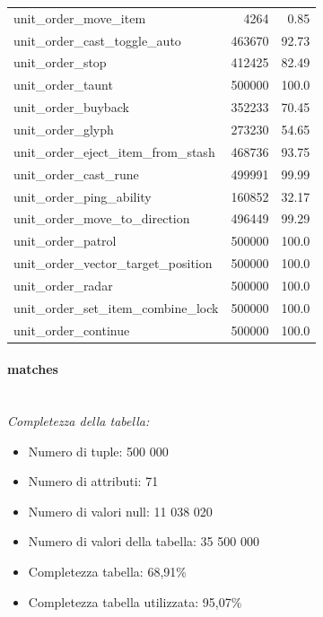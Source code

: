 \documentclass[a4paper,12pt,openany,oneside]{book}
\newcommand{\myparagraph}[1]{\paragraph{#1}\mbox{}\\[0.8em]}
\begin{document}
\begin{table}[H]
\begin{tabularx}{0.37\textwidth}{lrr}
		unit\_order\_move\_item                &   4264          &   0.85     \\
		unit\_order\_cast\_toggle\_auto         &   463670        &   92.73      \\
		unit\_order\_stop                     &   412425        &   82.49                 \\
		unit\_order\_taunt                    &   500000        &   100.0                  \\
		unit\_order\_buyback                  &   352233        &   70.45                \\
		unit\_order\_glyph                    &   273230        &   54.65     \\
		unit\_order\_eject\_item\_from\_stash    &   468736        &   93.75      \\
		unit\_order\_cast\_rune                &   499991        &   99.99                \\
		unit\_order\_ping\_ability             &   160852        &   32.17                \\
		unit\_order\_move\_to\_direction        &   496449        &   99.29                \\
		unit\_order\_patrol                   &   500000        &   100.0                  \\
		unit\_order\_vector\_target\_position   &   500000        &   100.0                  \\
		unit\_order\_radar                    &   500000        &   100.0                  \\
		unit\_order\_set\_item\_combine\_lock    &   500000        &   100.0                  \\
		unit\_order\_continue                 &   500000        &   100.0                  \\
	\end{tabularx}
\end{table}
\myparagraph{matches}
\textit{Completezza della tabella:}\\
\begin{itemize}
	\item Numero di tuple: 500 000
	\item Numero di attributi: 71
	\item Numero di valori null: 11 038 020
	\item Numero di valori della tabella: 35 500 000
	\item Completezza tabella: 68,91\%
	\item Completezza tabella utilizzata: 95,07\%
\end{itemize}
\end{document}
